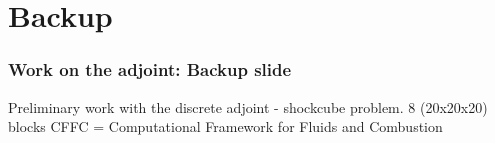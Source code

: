 \documentclass{beamer}
\begin{document}

\section{Backup}
\begin{frame}
\frametitle{Work on the adjoint: Backup slide}
\begin{minipage}[t][1\textheight]{1\textwidth}
\vspace{-20pt}
\begin{exampleblock}{Preliminary work with the discrete adjoint - shockcube problem. 8 (20x20x20) blocks}
\tiny
CFFC = Computational Framework for Fluids and Combustion
\vspace{-20pt}
\begin{figure}
\label{fig:shockedcube}
\centering
{}
\subfloat[\tiny{$\Psi_{\rho}$ at t = 0} \label{fig:adjRhoU}]

\end{figure}
\end{exampleblock}
\end{minipage}
\end{frame}
\end{document}
